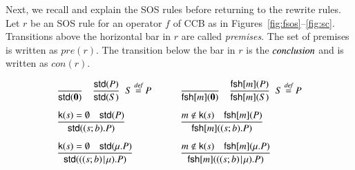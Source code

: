 {Next, we recall and explain the SOS rules before returning to 
the rewrite rules. Let $r$ be an SOS rule for an operator $f$ of CCB as in 
Figures~\ref{fig:fsos}--\ref{fig:sc}. 
Transitions above the horizontal bar in $r$ are called \emph{premises}. 
The set of premises is written as
$pre(r)$. The transition below the bar in $r$ is the $\emph{conclusion}$ and 
is written as $con(r)$. 

%
\begin{figure}[t] 
\[
\begin{array}{ll}
\Rule
{}
{\std{\Nil}} \quad 
\Rule
{\std{P}}
{\std{S}}
\;\;
S \bydef P
\qquad &
\Rule
{}
{\fresh{m}{\Nil}} \quad
\Rule
{\fresh{m}{P}}
{\fresh{m}{S}}
\;\;
S \bydef P
\\[15pt]
%
\Rule
{\kkey{s}=\emptyset \quad  \std{P}}
{\std{(s;b).P}}
\qquad &
\Rule
{m \notin \kkey{s} \quad \fresh{m}{P}}
{\fresh{m}{(s;b).P}}
\\[15pt]
%
\Rule
{\kkey{s}=\emptyset \quad  \std{\mu.P}}
{\std{((s;b)\Mid \mu).P}}
\qquad &
\Rule
{m \notin \kkey{s} \quad \fresh{m}{\mu.P}}
{\fresh{m}{((s;b)\Mid \mu).P}}
\\[15pt]
%


\end{array}\]
\end{figure}}
